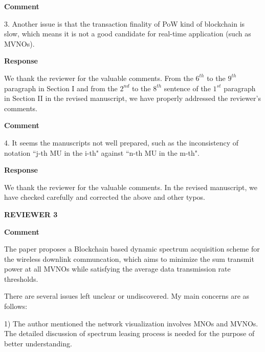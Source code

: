 \documentclass[12pt,draftcls, onecolumn]{IEEEtran}
\begin{document}
\vspace{3mm}
\noindent\textcolor[rgb]{1.00,0.00,0.00}{\textbf{Comment}}
\vspace{3mm}

3. Another issue is that the transaction finality of PoW kind of blockchain is slow, which means it is not a good candidate for real-time application (such as MVNOs).

\vspace{3mm} \noindent\textcolor[rgb]{0.00,0.00,1.00}{\textbf{Response}}
\vspace{2mm}

We thank the reviewer for the valuable comments. From the $ 6^{th} $ to the $ 9^{th} $ paragraph in Section I and from the $ 2^{nd} $ to the $ 8^{th} $ sentence of the $ 1^{st} $ paragraph in Section II in the revised manuscript, we have properly addressed the reviewer's comments.

\vspace{3mm}
\noindent\textcolor[rgb]{1.00,0.00,0.00}{\textbf{Comment}}
\vspace{3mm}


4. It seems the manuscripts not well prepared, such as the inconsistency of notation ``j-th MU in the i-th" against ``n-th MU in the m-th". 


\vspace{3mm} \noindent\textcolor[rgb]{0.00,0.00,1.00}{\textbf{Response}}
\vspace{2mm}

We thank the reviewer for the valuable comments. In the revised manuscript, we have checked carefully and corrected the above and other typos.

\newpage
\vspace{5mm} \noindent\textcolor[rgb]{1.00,0.00,0.00}{\textbf{REVIEWER
3}}

\vspace{3mm}
\noindent\textcolor[rgb]{1.00,0.00,0.00}{\textbf{Comment}}
\vspace{3mm}

The paper proposes a Blockchain based dynamic spectrum acquisition scheme for the wireless downlink communcation, which aims to minimize the sum transmit power at all MVNOs while satisfying the average data transmission rate thresholds.

There are several issues left unclear or undiscovered. My main concerns are as follows:

1) The author mentioned the network visualization involves MNOs and MVNOs. The detailed discussion of spectrum leasing process is needed for the purpose of better understanding.
\end{document}
